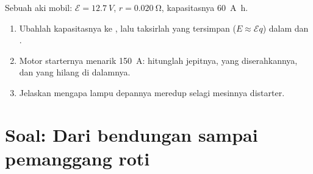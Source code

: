 \begin{exercise}[$\star\star\star$]\label{exo:g11:circuits-and-power:15}
Sebuah aki mobil: $\mathcal{E} = \qty{12.7}{V}$,
$r = \qty{0.020}{\ohm}$, kapasitasnya \qty{60}{A.h}.
\begin{enumerate}
  \item Ubahlah kapasitasnya ke , lalu taksirlah  yang
        tersimpan ($E \approx \mathcal{E} q$) dalam  dan
        .
  \item Motor starternya menarik \qty{150}{A}: hitunglah 
        jepitnya,  yang diserahkannya, dan  yang hilang di
        dalamnya.
  \item Jelaskan mengapa lampu depannya meredup selagi mesinnya
        distarter.
\end{enumerate}
\end{exercise}

\section{Soal: Dari bendungan sampai pemanggang roti}

